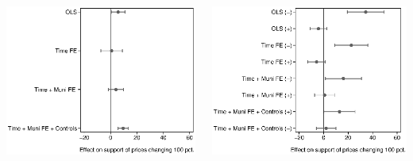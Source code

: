 \documentclass[aspectratio=169]{beamer}
\begin{document}
\begin{frame}
	\begin{columns}
		\includegraphics[width=1\textwidth]{../../figures/pooled_effects.eps} 
		


    \pause
		\includegraphics[width=1\textwidth]{../../figures/posneg_effects.eps}
		\end{columns} 		\pause
		
\end{frame}	
\end{document}
